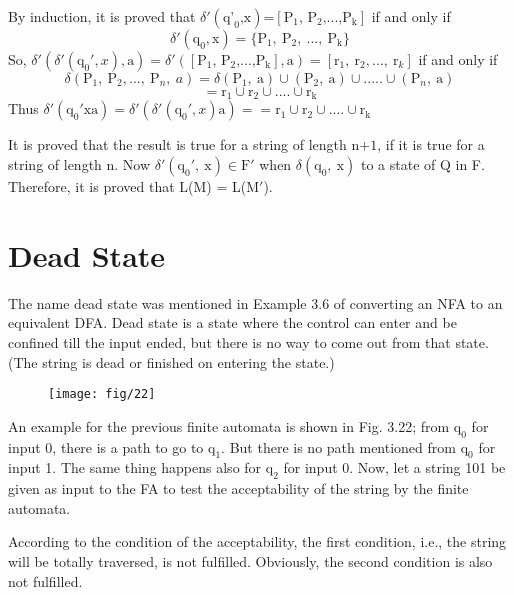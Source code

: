 \documentclass[12pt, a4paper]{article}
\begin{document}
By induction, it is proved that ${\delta }'\left( {{{\text{{q}'}}}_{\text{0}}}\text{,x} \right)\text{=}\left[ {{\text{P}}_{\text{1}}}\text{, }{{\text{P}}_{\text{2}}}\text{,}...\text{,}{{\text{P}}_{\text{k}}} \right]$  if and only if 
\[\delta'(\text{q}_\text{0},\text{x}) =\{\text{P}_\text{1},~ \text{P}_\text{2},~...,~ \text{P}_\text{k}\}\]
So, $\delta'(\delta'(\text{q}_0',x),\text{a})=\delta'(\left[ {{\text{P}}_{\text{1}}}\text{, }{{\text{P}}_{\text{2}}}\text{,}...\text{,}{{\text{P}}_{\text{k}}} \right],\text{a})=[\text{r}_1,~\text{r}_2,...,~\text{r}_k]$ if and only if
\[\delta({\text{P}_1,~\text{P}_2,...,~\text{P}_n},~a)=\delta (\text{P}_1,~\text{a})\cup (\text{P}_2,~\text{a}) \cup ..... \cup (\text{P}_n,~\text{a})\]
\[=\text{r}_1 \cup \text{r}_2 \cup ....\cup \text{r}_\text{k} \]
Thus $\delta'(\text{q}_0'\text{xa})=\delta'(\delta'(\text{q}_0',x)\text{a})==\text{r}_1 \cup \text{r}_2 \cup ....\cup \text{r}_\text{k}$

It is proved that the result is true for a string of length $\text{n+1}$, if it is true for a string of length n. Now $\delta'(\text{q}_0',~\text{x}) \in \text{F}'$ when $\delta(\text{q}_0,~\text{x})$ to a state of Q in F.\\
Therefore, it is proved that L(M) = L(M$'$).
\section{Dead State}
The name dead state was mentioned in Example 3.6 of converting an NFA to an equivalent DFA. Dead state is a state where the control can enter and be confined till the input ended, but there is no way to come out from that state. (The string is dead or finished on entering the state.)

\begin{figure}[h!]
	\begin{center}
		\texttt{[image: fig/22]}
		\label{fig3}
	\end{center}
\end{figure}

An example for the previous finite automata is shown in Fig. 3.22; from $\text{q}_0$ for input 0, there is a path to go to $\text{q}_1$. But there is no path mentioned from $\text{q}_0$ for input 1. The same thing happens also for $\text{q}_2$ for input 0. Now, let a string 101 be given as input to the FA to test the acceptability of the string by the finite automata.

According to the condition of the acceptability, the first condition, i.e., the string will be totally traversed, is not fulfilled. Obviously, the second condition is also not fulfilled.
\end{document}
